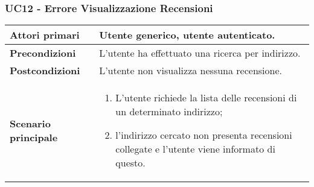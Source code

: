 \subsubsection{UC12 - Errore Visualizzazione Recensioni}
\label{UC12}
\begin{center}
\renewcommand{\arraystretch}{1.5}
\begin{tabular}{ | m{10em} | m{20em} | }
    \hline
    \textbf{Attori primari} & Utente generico, utente autenticato. \\
    \hline
    \textbf{Precondizioni} & L'utente ha effettuato una ricerca per indirizzo. \\
    \hline
    \textbf{Postcondizioni} & L'utente non visualizza nessuna recensione. \\
    \hline
    \textbf{Scenario principale} & \begin{enumerate}
        \item L'utente richiede la lista delle recensioni di un determinato indirizzo;
    \item l'indirizzo cercato non presenta recensioni collegate e l'utente viene
          informato di questo.
    \end{enumerate} \\
    \hline
   \end{tabular}
\end{center}

